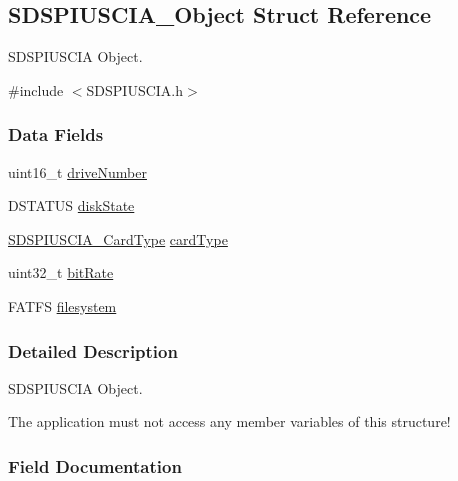\subsection{S\-D\-S\-P\-I\-U\-S\-C\-I\-A\-\_\-\-Object Struct Reference}
\label{struct_s_d_s_p_i_u_s_c_i_a___object}


S\-D\-S\-P\-I\-U\-S\-C\-I\-A Object.  




{\ttfamily \#include $<$S\-D\-S\-P\-I\-U\-S\-C\-I\-A.\-h$>$}

\subsubsection*{Data Fields}
\begin{DoxyCompactItemize}
\item 
uint16\-\_\-t \hyperlink{struct_s_d_s_p_i_u_s_c_i_a___object_a885e833c2dc6f823d1d9d54c80ad70b7}{drive\-Number}
\item 
D\-S\-T\-A\-T\-U\-S \hyperlink{struct_s_d_s_p_i_u_s_c_i_a___object_a480e38f59a4c875d6a5286f4236acb43}{disk\-State}
\item 
\hyperlink{_s_d_s_p_i_u_s_c_i_a_8h_a5852060f107db1a20619f34ec6bc1f07}{S\-D\-S\-P\-I\-U\-S\-C\-I\-A\-\_\-\-Card\-Type} \hyperlink{struct_s_d_s_p_i_u_s_c_i_a___object_a59c36212fa6b7bcc8f7d340b79085e52}{card\-Type}
\item 
uint32\-\_\-t \hyperlink{struct_s_d_s_p_i_u_s_c_i_a___object_a8b1960b8e1d77913620a580f68a73213}{bit\-Rate}
\item 
F\-A\-T\-F\-S \hyperlink{struct_s_d_s_p_i_u_s_c_i_a___object_ad56db692a9b386a9bddcbd989af74802}{filesystem}
\end{DoxyCompactItemize}


\subsubsection{Detailed Description}
S\-D\-S\-P\-I\-U\-S\-C\-I\-A Object. 

The application must not access any member variables of this structure! 

\subsubsection{Field Documentation}

